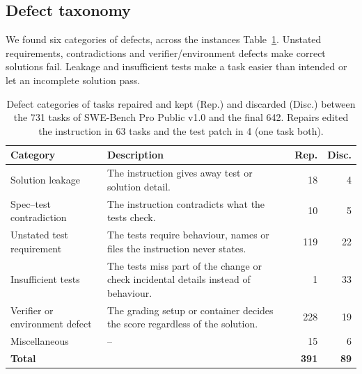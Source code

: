 \subsection{Defect taxonomy}
\label{sec:taxonomy}

We found six categories of defects, across the instances Table~\ref{tab:repairs-discards}. Unstated requirements, contradictions and verifier/environment defects make correct solutions fail. Leakage and insufficient tests make a task easier than intended or let an incomplete solution pass. 

\begin{table}[t]
\centering
\small
\setlength{\tabcolsep}{3pt}
\begin{tabularx}{\columnwidth}{@{}>{\raggedright\arraybackslash}p{2.05cm} >{\raggedright\arraybackslash}X r r@{}}
\toprule
\textbf{Category} & \textbf{Description} & \textbf{Rep.} & \textbf{Disc.} \\
\midrule
Solution leakage & The instruction gives away test or solution detail. & 18 & 4 \\
\addlinespace
Spec--test contradiction & The instruction contradicts what the tests check. & 10 & 5 \\
\addlinespace
Unstated test requirement & The tests require behaviour, names or files the instruction never states. & 119 & 22 \\
\addlinespace
Insufficient tests & The tests miss part of the change or check incidental details instead of behaviour. & 1 & 33 \\
\addlinespace
Verifier or environment defect & The grading setup or container decides the score regardless of the solution. & 228 & 19 \\
\addlinespace
Miscellaneous & -- & 15 & 6 \\
\midrule
\textbf{Total} & & \textbf{391} & \textbf{89} \\
\bottomrule
\end{tabularx}
\caption{Defect categories of tasks repaired and kept (Rep.) and discarded (Disc.) between the 731 tasks of SWE-Bench Pro Public v1.0 and the final 642. Repairs edited the instruction in 63 tasks and the test patch in 4 (one task both).} %
\label{tab:repairs-discards}
\end{table}

